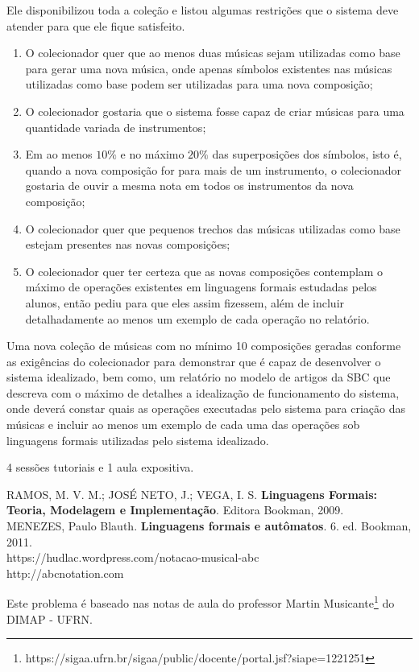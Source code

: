 Ele disponibilizou toda a coleção e listou algumas restrições que o sistema
deve atender para que ele fique satisfeito.

\begin{enumerate}
\item O colecionador quer que ao menos duas músicas sejam utilizadas como base para gerar uma nova música,
onde apenas símbolos existentes nas músicas utilizadas como base podem ser utilizadas para uma nova composição;
\item O colecionador gostaria que o sistema fosse capaz de criar músicas para uma quantidade variada de instrumentos;
\item Em ao menos $10\%$ e no máximo $20\%$ das superposições dos símbolos, isto é, quando a nova composição for para mais de um instrumento,
o colecionador gostaria de ouvir a mesma nota em todos os instrumentos da nova composição;
\item O colecionador quer que pequenos trechos das músicas utilizadas como base estejam
presentes nas novas composições;
\item O colecionador quer ter certeza que as novas composições contemplam o máximo
de operações existentes em linguagens formais estudadas pelos alunos, então pediu para
que eles assim fizessem, além de incluir detalhadamente ao menos um exemplo de cada operação
no relatório.
\end{enumerate}

Uma nova coleção de músicas com no mínimo 10 composições geradas conforme as exigências do colecionador
para demonstrar que é capaz de desenvolver o sistema idealizado, bem como, um relatório no modelo de
artigos da SBC que descreva com o máximo de detalhes a idealização de funcionamento do sistema, onde deverá
constar quais as operações executadas pelo sistema para criação das músicas e incluir ao menos
um exemplo de cada uma das operações sob linguagens formais utilizadas pelo sistema idealizado.

4 sessões tutoriais e 1 aula expositiva.

RAMOS, M. V. M.; JOSÉ NETO, J.; VEGA, I. S. \textbf{Linguagens Formais: Teoria, Modelagem e Implementação}. Editora Bookman, 2009.\\

\noindent
MENEZES, Paulo Blauth. \textbf{Linguagens formais e autômatos}. 6. ed. Bookman, 2011.\\

\noindent
https://hudlac.wordpress.com/notacao-musical-abc\\

\noindent
http://abcnotation.com

Este problema é baseado nas notas de aula do professor Martin Musicante\footnote{\scriptsize{https://sigaa.ufrn.br/sigaa/public/docente/portal.jsf?siape=1221251}} do DIMAP - UFRN.
